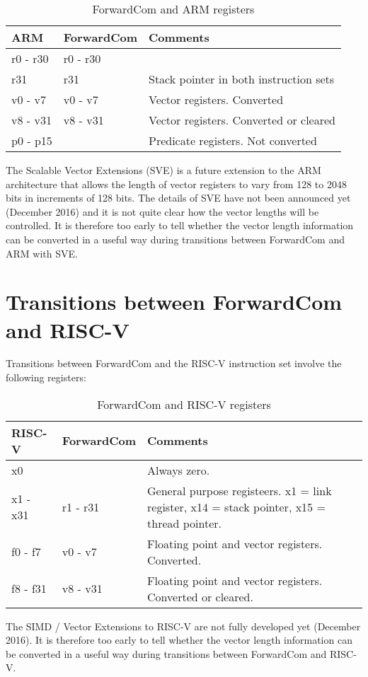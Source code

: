 \documentclass[forwardcom.tex]{subfiles}
\begin{document}
\begin{longtable} {|p{20mm}|p{20mm}|p{80mm}|}
\caption{ForwardCom and ARM registers} 
\label{table:ForwardComAndARMRegisters}
\\
\endfirsthead
\endhead
\hline
\bfseries ARM & \bfseries ForwardCom & \bfseries Comments  \\
\hline
r0 - r30 & r0 - r30 &   \\ 
\hline
r31 & r31 & Stack pointer in both instruction sets \\
\hline
v0 - v7 & v0 - v7 & Vector registers. Converted \\ 
\hline
v8 - v31 & v8 - v31 & Vector registers. Converted or cleared \\
\hline
p0 - p15 &  & Predicate registers. Not converted \\
\hline
\end{longtable}

\vspace{2mm}
The Scalable Vector Extensions (SVE) is a future extension to the ARM architecture that 
allows the length of vector registers to vary from 128 to 2048 bits in increments of 128 bits. The details of SVE have not been announced yet (December 2016) and it is not quite clear how the vector lengths will be controlled. It is therefore too early to tell whether 
the vector length information can be converted in a useful way during transitions between ForwardCom and ARM with SVE.

\section{Transitions between ForwardCom and RISC-V}

Transitions between ForwardCom and the RISC-V instruction set involve the following registers:

\begin{longtable} {|p{20mm}|p{20mm}|p{80mm}|}
\caption{ForwardCom and RISC-V registers} 
\label{table:ForwardComAndRISCVRegisters}
\\
\endfirsthead
\endhead
\hline
\bfseries RISC-V & \bfseries ForwardCom & \bfseries Comments  \\
\hline
x0 &  &  Always zero. \\
\hline
x1 - x31 & r1 - r31 & General purpose registeers. x1 = link register,
x14 = stack pointer, x15 = thread pointer. \\
\hline
f0 - f7 & v0 - v7 & Floating point and vector registers. Converted. \\ 
\hline
f8 - f31 & v8 - v31 & Floating point and vector registers. Converted or cleared. \\
\hline
\end{longtable}

\vspace{2mm}
The SIMD / Vector Extensions to RISC-V are not fully developed yet (December 2016). It is therefore too early to tell whether the vector length information can be converted in a useful way during transitions between ForwardCom and RISC-V.
\end{document}
